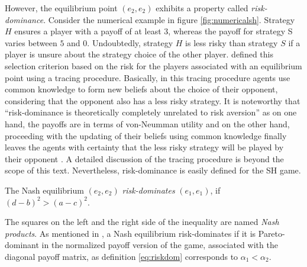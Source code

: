 However, the equilibrium point $(e_2,e_2)$ exhibits a property
called \textit{risk\hyp{}dominance}. 
Consider the numerical example in figure \ref{fig:numericalsh}. 
Strategy $H$ ensures a player with a payoff of at least $3$, whereas the 
payoff for strategy S varies between $5$ and $0$. Undoubtedly, 
strategy $H$ is less risky than strategy $S$ if a player is unsure 
about the strategy choice of the other player.
\textcite{harsanyi_general_1988} defined this selection criterion 
based on the risk for the players associated with an 
equilibrium point using a tracing procedure. 
Basically, in this tracing procedure agents use common knowledge
to form new beliefs about the choice of their opponent, considering that
the opponent also has a less risky strategy.
It is noteworthy that ``risk-dominance is theoretically completely unrelated
to risk aversion'' as on one hand, the payoffs are in terms of von-Neumman
utility and on the other hand, proceeding with the updating of their beliefs
using common knowledge finally leaves the agents with certainty that the less 
risky strategy will be played by their opponent 
\parencite[341]{straub_risk_1995}.
A detailed discussion of the tracing procedure is beyond the scope of this
text. Nevertheless, risk-dominance is easily defined for the SH game.
\begin{mydef}
 \label{eq:riskdom}
The Nash equilibrium $(e_2,e_2)$ \textit{risk-dominates} 
$(e_1,e_1)$, if $(d-b)^2 > (a-c)^2$. \end{mydef}
The squares on the left and the right side of the inequality are named
\textit{Nash products}.
As mentioned in \textcite{weibull_evolutionary_1997}, a Nash equilibrium 
risk-dominates if it is Pareto-dominant in the 
normalized payoff version of the game, 
associated with the diagonal payoff matrix, 
as definition \eqref{eq:riskdom} corresponds to $\alpha_1 < \alpha_2$.

